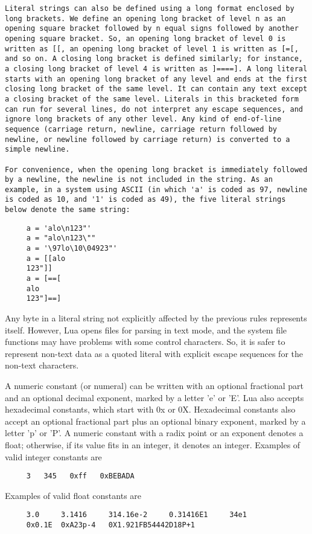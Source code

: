 \begin{itemize}
\begin{verbatim}
Literal strings can also be defined using a long format enclosed by long brackets. We define an opening long bracket of level n as an opening square bracket followed by n equal signs followed by another opening square bracket. So, an opening long bracket of level 0 is written as [[, an opening long bracket of level 1 is written as [=[, and so on. A closing long bracket is defined similarly; for instance, a closing long bracket of level 4 is written as ]====]. A long literal starts with an opening long bracket of any level and ends at the first closing long bracket of the same level. It can contain any text except a closing bracket of the same level. Literals in this bracketed form can run for several lines, do not interpret any escape sequences, and ignore long brackets of any other level. Any kind of end-of-line sequence (carriage return, newline, carriage return followed by newline, or newline followed by carriage return) is converted to a simple newline.

For convenience, when the opening long bracket is immediately followed by a newline, the newline is not included in the string. As an example, in a system using ASCII (in which 'a' is coded as 97, newline is coded as 10, and '1' is coded as 49), the five literal strings below denote the same string:
\end{verbatim}
\begin{lstlisting}
     a = 'alo\n123"'
     a = "alo\n123\""
     a = '\97lo\10\04923"'
     a = [[alo
     123"]]
     a = [==[
     alo
     123"]==]
\end{lstlisting}

Any byte in a literal string not explicitly affected by the previous rules represents itself. However, Lua opens files for parsing in text mode, and the system file functions may have problems with some control characters. So, it is safer to represent non-text data as a quoted literal with explicit escape sequences for the non-text characters.

A numeric constant (or numeral) can be written with an optional fractional part and an optional decimal exponent, marked by a letter 'e' or 'E'. Lua also accepts hexadecimal constants, which start with 0x or 0X. Hexadecimal constants also accept an optional fractional part plus an optional binary exponent, marked by a letter 'p' or 'P'. A numeric constant with a radix point or an exponent denotes a float; otherwise, if its value fits in an integer, it denotes an integer. Examples of valid integer constants are
\begin{lstlisting}
     3   345   0xff   0xBEBADA
\end{lstlisting}
Examples of valid float constants are
\begin{lstlisting}
     3.0     3.1416     314.16e-2     0.31416E1     34e1
     0x0.1E  0xA23p-4   0X1.921FB54442D18P+1
\end{lstlisting}


\end{itemize}
